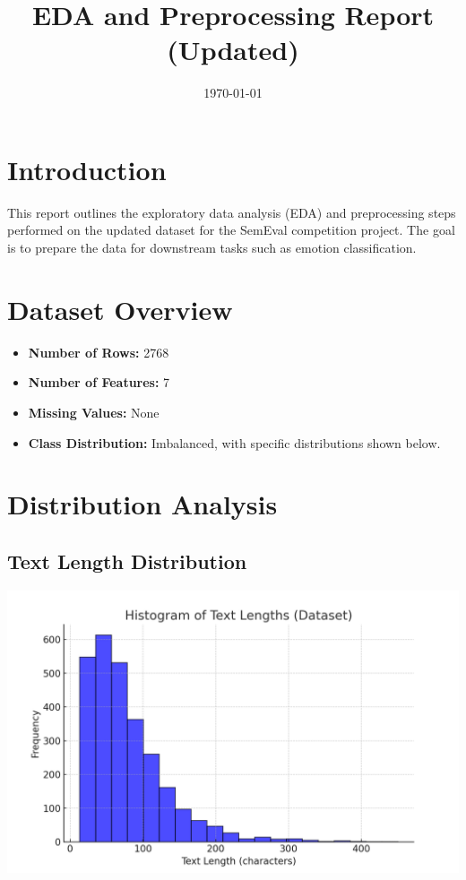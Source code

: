 \documentclass{article}
\title{EDA and Preprocessing Report (Updated)}
\author{}
\date{\today}
\begin{document}
\maketitle

\section*{Introduction}
This report outlines the exploratory data analysis (EDA) and preprocessing steps performed on the updated dataset 
for the SemEval competition project. The goal is to prepare the data for downstream tasks such as emotion classification.

\section*{Dataset Overview}
\begin{itemize}
    \item \textbf{Number of Rows:} 2768
    \item \textbf{Number of Features:} 7
    \item \textbf{Missing Values:} None
    \item \textbf{Class Distribution:} Imbalanced, with specific distributions shown below.
\end{itemize}

\section*{Distribution Analysis}
\subsection*{Text Length Distribution}
\includegraphics[width=\textwidth]{updated_text_length_histogram.png}
\end{document}

